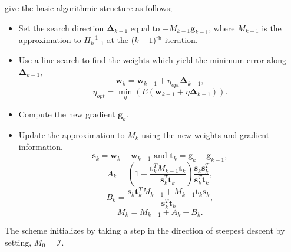 \documentclass[useAMS,usenatbib]{mnras}
\begin{document}
\cite{McLoone2002} give the basic algorithmic structure as follows;
\begin{itemize}
\item Set the search direction $\boldsymbol{\Delta}_{k-1}$ equal to $-M_{k-1} \boldsymbol{g}_{k-1}$, where $M_{k-1}$ is the approximation to $H^{-1}_{k-1}$ at the ($k-1$)$^\text{th}$ iteration.
\item Use a line search to find the weights which yield the minimum error along $\boldsymbol{\Delta}_{k-1}$,
\begin{equation}
\boldsymbol{w}_k = \boldsymbol{w}_{k-1} + \eta_{opt} \boldsymbol{\Delta}_{k-1},
\end{equation}
\begin{equation}
\eta_{opt} = \min\limits_\eta(E(\boldsymbol{w}_{k-1} + \eta \boldsymbol{\Delta}_{k-1})).
\end{equation}
\item Compute the new gradient $\boldsymbol{g}_k$.
\item Update the approximation to $M_k$ using the new weights and gradient information.
\begin{equation}
\boldsymbol{s}_{k} = \boldsymbol{w}_{k}- \boldsymbol{w}_{k-1} \text{ and } \boldsymbol{t}_{k} = \boldsymbol{g}_{k} - \boldsymbol{g}_{k-1},
\end{equation}
\begin{equation}
A_k = \left(1 + \frac{\boldsymbol{t}^T_k M_{k-1}\boldsymbol{t}_{k}}{\boldsymbol{s}^T_k\boldsymbol{t}_k}\right)\frac{\boldsymbol{s}_k \boldsymbol{s}^T_k}{\boldsymbol{s}^T_k\boldsymbol{t}_k},
\end{equation}
\begin{equation}
B_k = \frac{\boldsymbol{s}_k\boldsymbol{t}^T_k M_{k-1} + M_{k-1}\boldsymbol{t}_k\boldsymbol{s}_k}{\boldsymbol{s}^T_k\boldsymbol{t}_k},
\end{equation}
\begin{equation}\label{eq: update}
M_k = M_{k-1} + A_k - B_k.
\end{equation}
\end{itemize}
The scheme initializes by taking a step in the direction of steepest descent by setting, $M_0 = \mathcal{I}$.
\end{document}
